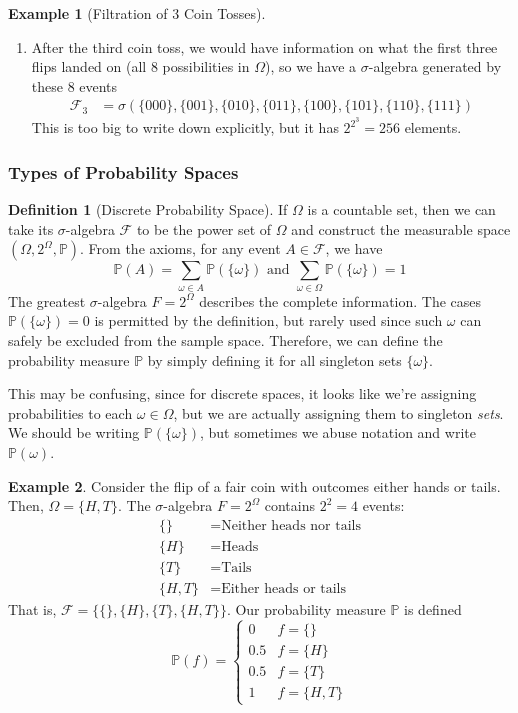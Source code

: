 \documentclass{article}
\theoremstyle{definition}
\newtheorem{example}{Example}[section]
\theoremstyle{remark}
\theoremstyle{definition}
\newtheorem{definition}{Definition}[section]
\begin{document}
\begin{example}[Filtration of 3 Coin Tosses]
\begin{enumerate}
    \item After the third coin toss, we would have information on what the first three flips landed on (all 8 possibilities in $\Omega$), so we have a $\sigma$-algebra generated by these 8 events 
    \begin{align*}
        \mathcal{F}_3 & = \sigma(\{000\}, \{001\}, \{010\}, \{011\}, \{100\}, \{101\}, \{110\}, \{111\})
    \end{align*}
    This is too big to write down explicitly, but it has $2^{2^3} = 256$ elements. 
\end{enumerate}
\end{example}

\subsubsection{Types of Probability Spaces}

\begin{definition}[Discrete Probability Space]
If $\Omega$ is a countable set, then we can take its $\sigma$-algebra $\mathcal{F}$ to be the power set of $\Omega$ and construct the measurable space $(\Omega, 2^\Omega, \mathbb{P})$. From the axioms, for any event $A \in \mathcal{F}$, we have
\[\mathbb{P} (A) = \sum_{\omega \in A} \mathbb{P}(\{\omega\}) \text{ and } \sum_{\omega \in \Omega} \mathbb{P}(\{\omega\}) = 1\]
The greatest $\sigma$-algebra $F = 2^{\Omega}$ describes the complete information. The cases $\mathbb{P}(\{\omega\}) = 0$ is permitted by the definition, but rarely used since such $\omega$ can safely be excluded from the sample space. Therefore, we can define the probability measure $\mathbb{P}$ by simply defining it for all singleton sets $\{\omega\}$. 
\end{definition}

This may be confusing, since for discrete spaces, it looks like we're assigning probabilities to each $\omega \in \Omega$, but we are actually assigning them to singleton \textit{sets}. We should be writing $\mathbb{P}(\{\omega\})$, but sometimes we abuse notation and write $\mathbb{P}(\omega)$. 

\begin{example}
Consider the flip of a fair coin with outcomes either hands or tails. Then, $\Omega = \{H, T\}$. The $\sigma$-algebra $F = 2^{\Omega}$ contains $2^2 = 4$ events: 
\begin{align*}
    \{\} &= \text{Neither heads nor tails} \\
    \{H\} &= \text{Heads} \\
    \{T\} &= \text{Tails} \\
    \{H, T\} &= \text{Either heads or tails}
\end{align*}
That is, $\mathcal{F} = \{\{\}, \{H\}, \{T\}, \{H, T\}\}$. Our probability measure $\mathbb{P}$ is defined
\[\mathbb{P}(f) = \begin{cases}
0 & f = \{\} \\
0.5 & f = \{H\} \\
0.5 & f = \{T\} \\
1 & f = \{H, T\}
\end{cases}\]
\end{example}
\end{document}
